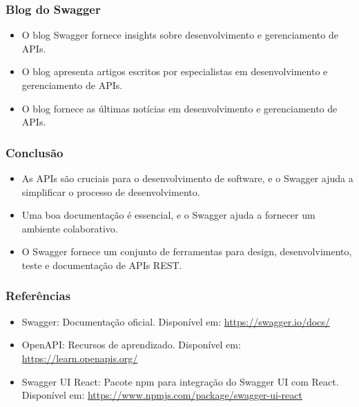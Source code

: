 \documentclass{beamer}
\begin{document}
\begin{frame}
  \frametitle{Blog do Swagger}
  
  
  \begin{itemize}
    \item O blog Swagger fornece insights sobre desenvolvimento e gerenciamento de APIs.
    \item O blog apresenta artigos escritos por especialistas em desenvolvimento e gerenciamento de APIs.
    \item O blog fornece as últimas notícias em desenvolvimento e gerenciamento de APIs.
  \end{itemize}
  
  \end{frame}
  

  \begin{frame}
    \frametitle{Conclusão}
    
    
    \begin{itemize}
      \item As APIs são cruciais para o desenvolvimento de software, e o Swagger ajuda a simplificar o processo de desenvolvimento.
      \item Uma boa documentação é essencial, e o Swagger ajuda a fornecer um ambiente colaborativo.
      \item O Swagger fornece um conjunto de ferramentas para design, desenvolvimento, teste e documentação de APIs REST.
    \end{itemize}
    
    \end{frame}
    
    \begin{frame}
      \frametitle{Referências}
      
      \begin{itemize}
        \item Swagger: Documentação oficial. Disponível em: \url{https://swagger.io/docs/}
        \item OpenAPI: Recursos de aprendizado. Disponível em: \url{https://learn.openapis.org/}
        \item Swagger UI React: Pacote npm para integração do Swagger UI com React. Disponível em: \url{https://www.npmjs.com/package/swagger-ui-react}
      \end{itemize}
      
      \end{frame}
      
                                
\backmatter
\end{document}
